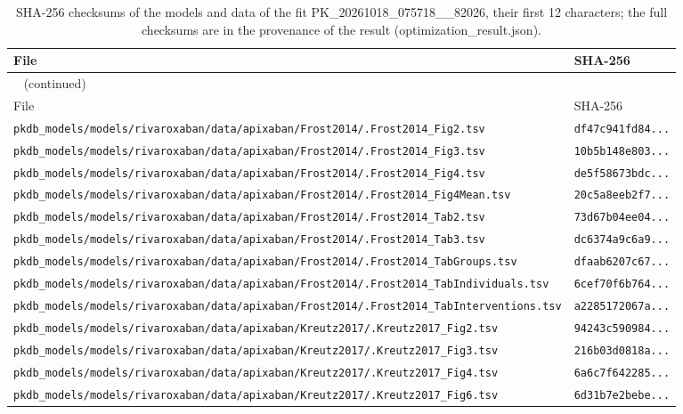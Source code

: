 \begin{longtable}{ll}
\caption{SHA-256 checksums of the models and data of the fit PK\_20261018\_075718\_\_82026, their first 12 characters; the full checksums are in the provenance of the result (optimization\_result.json).}\label{tab:checksums:PK_20261018_075718__82026} \\
\toprule
File & SHA-256 \\
\midrule
\endfirsthead
\multicolumn{2}{l}{\small\tablename~\thetable{} (continued)} \\
\toprule
File & SHA-256 \\
\midrule
\endhead
\bottomrule
\endlastfoot
\texttt{pkdb\_models/models/rivaroxaban/data/apixaban/Frost2014/.Frost2014\_Fig2.tsv} & \texttt{df47c941fd84...} \\
\texttt{pkdb\_models/models/rivaroxaban/data/apixaban/Frost2014/.Frost2014\_Fig3.tsv} & \texttt{10b5b148e803...} \\
\texttt{pkdb\_models/models/rivaroxaban/data/apixaban/Frost2014/.Frost2014\_Fig4.tsv} & \texttt{de5f58673bdc...} \\
\texttt{pkdb\_models/models/rivaroxaban/data/apixaban/Frost2014/.Frost2014\_Fig4Mean.tsv} & \texttt{20c5a8eeb2f7...} \\
\texttt{pkdb\_models/models/rivaroxaban/data/apixaban/Frost2014/.Frost2014\_Tab2.tsv} & \texttt{73d67b04ee04...} \\
\texttt{pkdb\_models/models/rivaroxaban/data/apixaban/Frost2014/.Frost2014\_Tab3.tsv} & \texttt{dc6374a9c6a9...} \\
\texttt{pkdb\_models/models/rivaroxaban/data/apixaban/Frost2014/.Frost2014\_TabGroups.tsv} & \texttt{dfaab6207c67...} \\
\texttt{pkdb\_models/models/rivaroxaban/data/apixaban/Frost2014/.Frost2014\_TabIndividuals.tsv} & \texttt{6cef70f6b764...} \\
\texttt{pkdb\_models/models/rivaroxaban/data/apixaban/Frost2014/.Frost2014\_TabInterventions.tsv} & \texttt{a2285172067a...} \\
\texttt{pkdb\_models/models/rivaroxaban/data/apixaban/Kreutz2017/.Kreutz2017\_Fig2.tsv} & \texttt{94243c590984...} \\
\texttt{pkdb\_models/models/rivaroxaban/data/apixaban/Kreutz2017/.Kreutz2017\_Fig3.tsv} & \texttt{216b03d0818a...} \\
\texttt{pkdb\_models/models/rivaroxaban/data/apixaban/Kreutz2017/.Kreutz2017\_Fig4.tsv} & \texttt{6a6c7f642285...} \\
\texttt{pkdb\_models/models/rivaroxaban/data/apixaban/Kreutz2017/.Kreutz2017\_Fig6.tsv} & \texttt{6d31b7e2bebe...} \\

\end{longtable}

